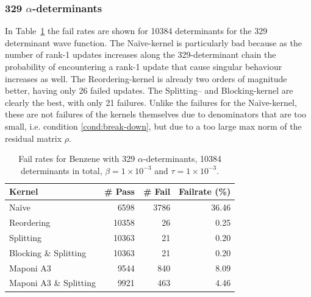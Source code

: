 \documentclass[11pt]{article}
\numberwithin{figure}{section}
\numberwithin{table}{section}
\begin{document}
      \subsubsection{329 $\alpha$-determinants}
        In Table~\ref{tab:fr329} the fail rates are shown for 10384 determinants for the 329 determinant wave function. The Na\"{i}ve-kernel is particularly bad because as the number of rank-1 updates increases along the 329-determinant chain the probability of encountering a rank-1 update that cause singular behaviour increases as well. The Reordering-kernel is already two orders of magnitude better, having only 26 failed updates. The Splitting-- and Blocking-kernel are clearly the best, with only 21 failures. Unlike the failures for the Na\"{i}ve-kernel, these are not failures of the kernels themselves due to denominators that are too small, i.e. condition \ref{cond:break-down}, but due to a too large max norm of the residual matrix $\rho$.\\
\begin{table}[h]
	\centering
		\begin{tabular}{@{}lrrr@{}}
			\toprule
			Kernel   & \# Pass & \# Fail & Failrate (\%) \\ \midrule
			Na\"{i}ve    & 6598     	&  3786           &    36.46      \\
			Reordering    & 10358 		& 26              &    0.25      \\
			Splitting    & 10363 		&  21           &      0.20    \\
			Blocking \& Splitting    & 10363  	& 21              &   0.20       \\
			Maponi A3  & 9544 	&  840            &  8.09        \\
			Maponi A3 \& Splitting & 9921   &  463           &   4.46       \\ \bottomrule
		\end{tabular}
		\caption{Fail rates for Benzene with 329 $\alpha$-determinants, 10384 determinants in total, $\beta=1\times10^{-3}$ and $\tau=1\times10^{-3}$.}
		\label{tab:fr329}
\end{table}
				
\end{document}
